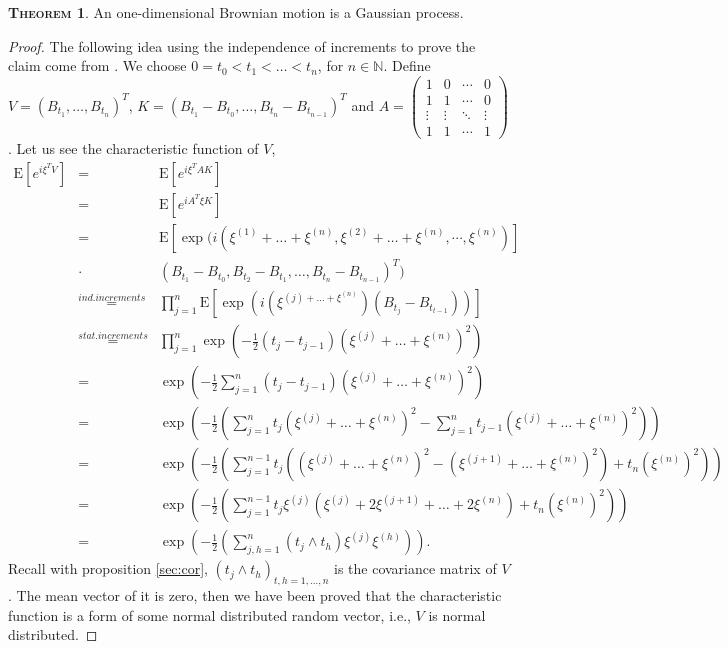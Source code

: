 \documentclass[a4paper, twoside, 11pt]{article}
\theoremstyle{definition}
\newtheorem{theorem}[definition]{\scshape Theorem}
\begin{document}
\begin{theorem}
  An one-dimensional Brownian motion is a Gaussian process.
\end{theorem}
\begin{proof}
  The following idea using the independence of increments to prove the claim come from \cite{shilling}.
  We choose $0=t_0<t_1<\dots<t_n$, for $n \in \mathbb{N}$. Define
  $V = (B_{t_1},\dots,B_{t_n})^T$,  $K = (B_{t_1}-B_{t_0},\dots, B_{t_n}-B_{t_{n-1}})^T$ and 
  $A = 
  \begin{pmatrix}
	1      & 0      & \cdots & 0\\
	1      & 1      & \cdots & 0\\
	\vdots & \vdots & \ddots & \vdots \\
	1      & 1      & \cdots & 1
  \end{pmatrix}
	$.
  Let us see the characteristic function of $V$,
  \begin{eqnarray*}
	\mathrm{E} [e^{i\xi^T V}] &=& \mathrm{E} [e^{i\xi^T AK}]\\ 
	&=& \mathrm{E} [e^{iA^T\xi K}]\\
	&=& \mathrm{E} [\exp(i (\xi^{(1)}+\dots+\xi^{(n)}, \xi^{(2)}+\dots+\xi^{(n)}, \cdots,\xi^{(n)})] \\
	&\cdot& (B_{t_1}-B_{t_0}, B_{t_2}-B_{t_1},\dots,B_{t_n}-B_{t_{n-1}})^T)\\
	&\overset{ind.increments}{=}& \prod_{j=1}^n \mathrm{E} [\exp(i(\xi^{(j)+\dots+\xi^{(n)}})(B_{t_j}-B_{t_{t-1}}))]\\
	&\overset{stat.increments}{=}& \prod_{j=1}^n \exp(-\frac{1}{2}(t_j - t_{j-1})(\xi^{(j)}+\dots+\xi^{(n)})^2) \\
	&=& \exp\left(-\frac{1}{2}\sum_{j=1}^n (t_j - t_{j-1})(\xi^{(j)}+\dots+\xi^{(n)})^2\right)\\
    &=& \exp\left(-\frac{1}{2}\left(\sum_{j=1}^n t_j(\xi^{(j)}+\dots+\xi^{(n)})^2 - \sum_{j=1}^n t_{j-1}(\xi^{(j)}+\dots+\xi^{(n)})^2\right)\right)\\
	&=& \exp\left(-\frac{1}{2}\left(\sum_{j=1}^{n-1} t_j((\xi^{(j)}+\dots+\xi^{(n)})^2 - (\xi^{(j+1)}+\dots+\xi^{(n)})^2) + t_n(\xi^{(n)})^2\right)\right)\\
	&=& \exp\left(-\frac{1}{2}\left(\sum_{j=1}^{n-1} t_j\xi^{(j)}(\xi^{(j)}+2\xi^{(j+1)}+\dots+2\xi^{(n)}) + t_n(\xi^{(n)})^2\right)\right)\\
	&=& \exp\left(-\frac{1}{2}\left(\sum_{j,h=1}^n(t_j\wedge t_h)\xi^{(j)}\xi^{(h)}\right)\right).
  \end{eqnarray*}
  Recall with proposition \ref{sec:cor}, $(t_j\wedge t_h)_{t,h=1,\dots,n}$ is the covariance matrix of $V$. The mean vector of it is zero, then we have been proved that the characteristic function is a form of some normal distributed random vector, i.e., $V$ is normal distributed.
\end{proof}
\end{document}
